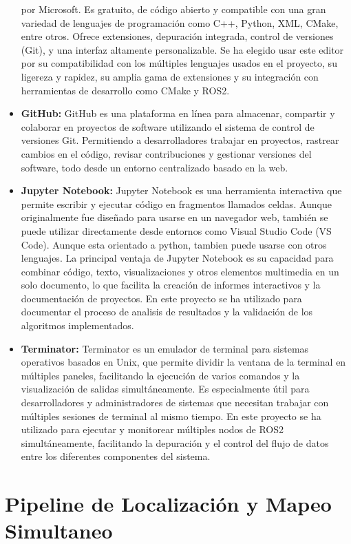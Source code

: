 \documentclass[12pt, a4paper, twoside]{article}
\begin{document}
\begin{itemize}
      por Microsoft. Es gratuito, de código abierto y compatible con una gran variedad de lenguajes de programación como C++, 
      Python, XML, CMake, entre otros. Ofrece extensiones, depuración integrada, control de versiones (Git), y una interfaz 
      altamente personalizable. Se ha elegido usar este editor por su compatibilidad con los múltiples lenguajes usados en el 
      proyecto, su ligereza y rapidez, su amplia gama de extensiones y su integración con herramientas de desarrollo como CMake y ROS2.
      \item \textbf{GitHub:} GitHub es una plataforma en línea para almacenar, compartir y colaborar en proyectos de software utilizando 
      el sistema de control de versiones Git. Permitiendo a desarrolladores trabajar en proyectos, rastrear cambios en el código, 
      revisar contribuciones y gestionar versiones del software, todo desde un entorno centralizado basado en la web.
      \item \textbf{Jupyter Notebook:} Jupyter Notebook es una herramienta interactiva que permite escribir y ejecutar código 
      en fragmentos llamados celdas. Aunque originalmente fue diseñado para usarse en un navegador web, también se puede utilizar 
      directamente desde entornos como Visual Studio Code (VS Code). Aunque esta orientado a python, tambien puede usarse con otros 
      lenguajes. La principal ventaja de Jupyter Notebook es su capacidad para combinar código, texto, visualizaciones y otros elementos
      multimedia en un solo documento, lo que facilita la creación de informes interactivos y la documentación de proyectos. 
      En este proyecto se ha utilizado para documentar el proceso de analisis de resultados y la validación de los algoritmos implementados.
      \item \textbf{Terminator:} Terminator es un emulador de terminal para sistemas operativos basados en Unix, que permite dividir la
      ventana de la terminal en múltiples paneles, facilitando la ejecución de varios comandos y la visualización de salidas
      simultáneamente. Es especialmente útil para desarrolladores y administradores de sistemas que necesitan trabajar
      con múltiples sesiones de terminal al mismo tiempo. En este proyecto se ha utilizado para ejecutar y monitorear múltiples 
      nodos de ROS2 simultáneamente, facilitando la depuración y el control del flujo de datos entre los diferentes componentes del sistema.
\end{itemize}

\section{Pipeline de Localización y Mapeo Simultaneo}
\end{document}

